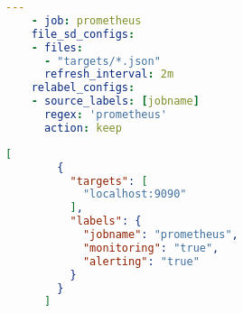 \begin{multicols}{2}
    \begin{lstlisting}[language=yaml,frame=single,caption={Usando file\_sd\_configs:},label={lst:file_sd_prom.yml}]
    ---
    - job: prometheus
    file_sd_configs:
    - files:
      - "targets/*.json"
      refresh_interval: 2m
    relabel_configs:
    - source_labels: [jobname]
      regex: 'prometheus'
      action: keep
    \end{lstlisting}
    \columnbreak
    \begin{lstlisting}[language=json,frame=single,caption={Especificación de	\textit{targets} en JSON:},label={lst:targets.json}]
      [
        {
          "targets": [
            "localhost:9090"
          ],
          "labels": {
            "jobname": "prometheus",
            "monitoring": "true",
            "alerting": "true"
          }
        }
      ]
      \end{lstlisting}
    \end{multicols}